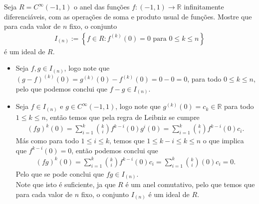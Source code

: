 \begin{homeworkProblem}[8]
  Seja $R=C^{\infty}(-1,1)$ o anel das funções $f:(-1,1)\to \mathbb{R}$ infinitamente diferenciáveis, com as operações de soma e produto usual de funções. Mostre que para cada valor de $n$ fixo, o conjunto
  \begin{align*}
    I_{(n)}:=\left\{ f\in R:f^{(k)}(0)=0\text{ para }0\leq k\leq n \right\}
  \end{align*}
  é um ideal de $R$.
  \begin{solution}
  \begin{itemize}
    \item Seja $f,g\in I_{(n)}$, logo note que $(g-f)^{(k)}(0)=g^{(k)}(0)-f^{(k)}(0)=0-0=0$, para todo $0\leq k\leq n$, pelo que podemos conclui que $f-g\in I_{(n)}$.
    \item Seja $f\in I_{(n)}$ e $g\in C^{\infty}(-1,1)$, logo note que $g^{(k)}(0)=c_k\in\mathbb{R}$ para todo $1\leq k\leq n$, então temos que pela regra de Leibniz se cumpre
      \begin{align*}
        (fg)^{k}(0)=\sum_{i=1}^{k}\binom{k}{i}f^{k-i}(0)g^{i}(0)=\sum_{i=1}^{k}\binom{k}{i}f^{k-i}(0)c_i.
      \end{align*}
      Más como para todo $1\leq i\leq k$, temos que $1\leq k-i\leq k\leq n$ o que implica que $f^{{k-i}}(0)=0$, então podemos conclui que
      \begin{align*}
        (fg)^{k}(0)=\sum_{i=1}^{k}\binom{k}{i}f^{k-i}(0)c_i=\sum_{i=1}^{k}\binom{k}{i}(0)c_i=0.
      \end{align*}
      Pelo que se pode conclui que $fg\in I_{(n)}$.\\
      Note que isto é suficiente, ja que $R$ é um anel comutativo, pelo que temos que para cada valor de $n$ fixo, o conjunto $I_{(n)}$ é um ideal de $R$. 
  \end{itemize}
  \end{solution}
\end{homeworkProblem}
